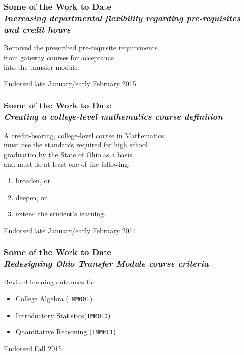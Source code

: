 \documentclass[14pt]{beamer}
\newcounter{a}
\newcounter{b}
\begin{document}
\begin{frame}
  \frametitle{Some of the Work to Date \\ \textit{Increasing departmental flexibility regarding pre-requisites
    and credit hours}}

Removed the prescribed pre-requisite requirements \\
\quad from gateway courses for acceptance \\
\quad\quad into the transfer module.

\vfill\hfill\textcolor{dark}{\footnotesize Endorsed late January/early February 2015}
\end{frame}

\begin{frame}
  \frametitle{Some of the Work to Date \\
    \textit{Creating a college-level mathematics course definition}}

  A credit-bearing, college-level course in Mathematics \\
  \quad must use the standards required for high school \\
  \quad\quad graduation by the State of Ohio
  as a basis \\
  \quad and must do at least one of the following:
\begin{enumerate}
\item broaden\textcolor{dark}{, or}
\item deepen\textcolor{dark}{, or}
\item extend the student's learning.
\end{enumerate}

\vfill\hfill\textcolor{dark}{\footnotesize Endorsed late January/early February 2014}
\end{frame}

\begin{frame}
  \frametitle{Some of the Work to Date \\ \textit{Redesigning Ohio Transfer Module course criteria}}

Revised learning outcomes for\ldots

\begin{itemize}
\item College Algebra \hfill\textcolor{dark}{(\href{http://regents.ohio.gov/transfer/otm/math-stats-log/TMM001-College-Algebra.pdf}{\texttt{TMM001}})}
\item Introductory Statistics\hfill\textcolor{dark}{(\href{http://regents.ohio.gov/transfer/otm/math-stats-log/TMM010.pdf}{\texttt{TMM010}})}
\item Quantitative Reasoning\hfill\textcolor{dark}{ (\href{https://www.ohiohighered.org/sites/ohiohighered.org/files/uploads/transfer/documents/OTM/TMM011 Quantitative Reasoning FINALIZED v2- 12-21-2015.pdf}{\texttt{TMM011}})}
\end{itemize}

\vfill\hfill\textcolor{dark}{\footnotesize Endorsed Fall 2015}
  \end{frame}
\end{document}

